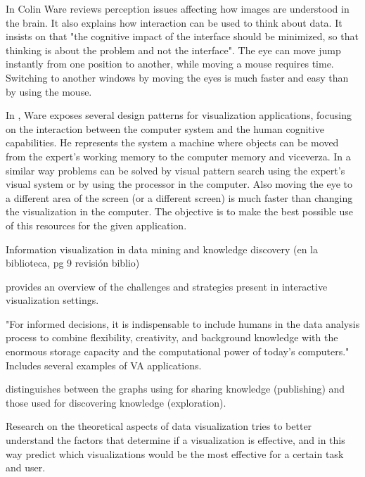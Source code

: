 In \autocite{ware_information_2004} Colin Ware reviews perception issues affecting how images are understood in the brain. It also explains how interaction can be used to think about data. It insists on that "the cognitive impact of the interface should be minimized, so that thinking is about the problem and not the interface". The eye can move jump instantly from one position to another, while moving a mouse requires time. Switching to another windows by moving the eyes is much faster and easy than by using the mouse.
	
In \autocite{ware_visual_2013}, Ware exposes several design patterns for visualization applications, focusing on the interaction between the computer system and the human cognitive capabilities. He represents the system a machine where objects can be moved from the expert's working memory to the computer memory and viceverza. In a similar way problems can be solved by visual pattern search using the expert's visual system or by using the processor in the computer. Also moving the eye to a different area of the screen (or a different screen) is much faster than changing the visualization in the computer.
The objective is to make the best possible use of this resources for the given application. 
	
\autocite{fayyad_information_2002}	Information visualization in data mining and knowledge discovery (en la biblioteca, pg 9 revisión biblio)




\autocite{spence_information_2007} provides an overview of the challenges and strategies present in interactive visualization settings.

\autocite{keim_visual_2008} "For informed decisions, it is indispensable to include humans in the data analysis process to combine flexibility, creativity, and background knowledge with the enormous storage capacity and the computational power of today’s computers." Includes several examples of VA applications.
	
\autocite{card_structure_1997}	distinguishes between the graphs using for sharing knowledge (publishing) and those used for discovering knowledge (exploration). 

Research on the theoretical aspects of data visualization \autocite{purchase_theoretical_2008} tries to better understand the factors that determine if a visualization is effective, and in this way predict which visualizations would be the most effective for a certain task and user.
	

